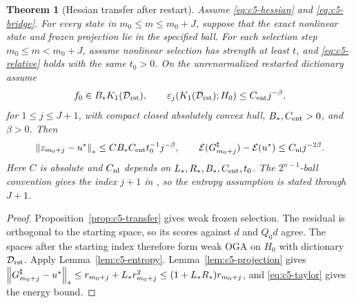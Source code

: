 \documentclass[11pt]{article}
\newtheorem{theorem}{Theorem}[section]
\theoremstyle{remark}
\begin{document}
\begin{theorem}[Hessian transfer after restart]
\label{thm:c5-hessian}
Assume \eqref{eq:c5-hessian} and \eqref{eq:c5-bridge}.
For every state in $m_0\leq m\leq m_0+J$, suppose that the exact nonlinear
state and frozen projection lie in the specified ball.
For each selection step $m_0\leq m<m_0+J$, assume nonlinear selection
has strength at least $t$, and \eqref{eq:c5-relative} holds with
the same $t_0>0$. On the unrenormalized restarted dictionary assume
\begin{equation}
 f_0\in B_*K_1(\mathcal D_{\rm rst}),\qquad
 \varepsilon_j(K_1(\mathcal D_{\rm rst});H_0)\leq C_{\rm ent}j^{-\beta},
 \label{eq:c5-source-entropy}
\end{equation}
for $1\leq j\leq J+1$, with compact closed absolutely convex hull,
$B_*,C_{\rm ent}>0$, and $\beta>0$.
Then
\[
 \left\lVert z_{m_0+j}-u^*\right\rVert_*\leq
 C B_*C_{\rm ent}t_0^{-1}j^{-\beta},\qquad
 \mathcal E(G_{m_0+j}^\sharp)-\mathcal E(u^*)\leq C_{\rm nl}j^{-2\beta}.
\]
Here \(C\) is absolute and \(C_{\rm nl}\) depends on \(L_*,R_*,B_*,C_{\rm ent},t_0\). The \(2^{n-1}\)-ball convention gives the index \(j+1\) in , so the entropy assumption is stated through \(J+1\).
\end{theorem}
\begin{proof}
Proposition~\ref{prop:c5-transfer} gives weak frozen selection.
The residual is orthogonal to the starting space, so its scores against
$d$ and $Q_0d$ agree. The spaces after the starting index therefore form weak OGA
on $H_0$ with dictionary $\mathcal D_{\rm rst}$. Apply
Lemma~\ref{lem:c5-entropy}. Lemma~\ref{lem:c5-projection} gives
$\left\lVert G_{m_0+j}^\sharp-u^*\right\rVert_*
\leq r_{m_0+j}+L_*r_{m_0+j}^2
\leq(1+L_*R_*)r_{m_0+j}$, and \eqref{eq:c5-taylor}
gives the energy bound.
\end{proof}
\end{document}

